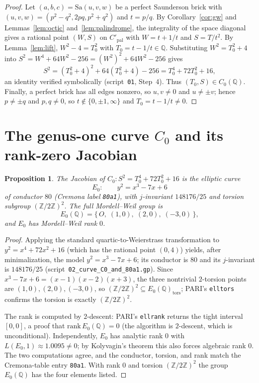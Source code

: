 \documentclass[11pt,reqno]{amsart}
\theoremstyle{plain}
\newtheorem{proposition}[theorem]{Proposition}
\theoremstyle{definition}
\newcommand{\Q}{\mathbb{Q}}
\newcommand{\Z}{\mathbb{Z}}
\begin{document}
\begin{proof}
Let $(a,b,c)=\mathrm{Sa}(u,v,w)$ be a perfect Saunderson brick with
$(u,v,w)=(p^2-q^2,2pq,p^2+q^2)$ and $t=p/q$. By Corollary~\ref{cor:gw} and
Lemmas~\ref{lem:octic} and~\ref{lem:palindrome}, the integrality of the space
diagonal gives a rational point $(W,S)$ on $C'_{\mathrm{pal}}$ with $W=t+1/t$
and $S=T/t^2$. By Lemma~\ref{lem:lift}, $W^2-4=T_0^2$ with $T_0=t-1/t\in\Q$.
Substituting $W^2=T_0^2+4$ into $S^2=W^4+64W^2-256=(W^2)^2+64W^2-256$ gives
\[
S^2=(T_0^2+4)^2+64(T_0^2+4)-256=T_0^4+72T_0^2+16,
\]
an identity verified symbolically (script~\texttt{01}, Step~4). Thus
$(T_0,S)\in C_0(\Q)$. Finally, a perfect brick has all edges nonzero, so
$u,v\neq0$ and $u\neq\pm v$; hence $p\neq\pm q$ and $p,q\neq0$, so
$t\notin\{0,\pm1,\infty\}$ and $T_0=t-1/t\neq0$.
\end{proof}

\section{The genus-one curve \texorpdfstring{$C_0$}{C0} and its rank-zero Jacobian}\label{sec:C0}

\begin{proposition}\label{prop:jac}
The Jacobian of $C_0:S^2=T_0^4+72T_0^2+16$ is the elliptic curve
\[
E_0:\qquad y^2=x^3-7x+6
\]
of conductor $80$ \textup{(}Cremona label \texttt{80a1}\textup{)}, with
$j$-invariant $148176/25$ and torsion subgroup $(\Z/2\Z)^2$. The full
Mordell--Weil group is
\[
E_0(\Q)=\{\,O,\;(1,0),\;(2,0),\;(-3,0)\,\},
\]
and $E_0$ has Mordell--Weil rank $0$.
\end{proposition}

\begin{proof}
Applying the standard quartic-to-Weierstrass transformation to
$y^2=x^4+72x^2+16$ (which has the rational point $(0,4)$) yields, after
minimalization, the model $y^2=x^3-7x+6$; its conductor is $80$ and its
$j$-invariant is $148176/25$ (script~\texttt{02\_curve\_C0\_and\_80a1.gp}).
Since $x^3-7x+6=(x-1)(x-2)(x+3)$, the three nontrivial $2$-torsion points are
$(1,0),(2,0),(-3,0)$, so $(\Z/2\Z)^2\subseteq E_0(\Q)_{\mathrm{tors}}$; PARI's
\texttt{elltors} confirms the torsion is exactly $(\Z/2\Z)^2$.

The rank is computed by $2$-descent: PARI's \texttt{ellrank} returns the tight
interval $[0,0]$, a proof that $\mathrm{rank}\,E_0(\Q)=0$ (the algorithm is
$2$-descent, which is unconditional). Independently, $E_0$ has analytic rank
$0$ with $L(E_0,1)\approx1.0095\neq0$; by Kolyvagin's theorem this also forces
algebraic rank $0$. The two computations agree, and the conductor, torsion, and
rank match the Cremona-table entry \texttt{80a1}. With rank $0$ and torsion
$(\Z/2\Z)^2$ the group $E_0(\Q)$ has the four elements listed.
\end{proof}
\end{document}
